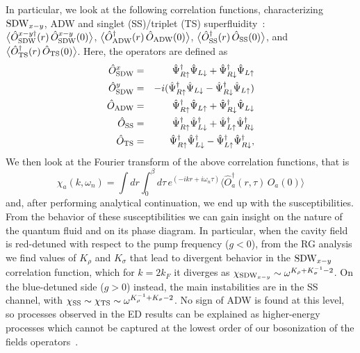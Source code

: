 \documentclass[pra,aps,superscriptaddress,twocolumn]{revtex4}
\begin{document}
In particular, we look at the following correlation functions, characterizing ${\rm SDW}_{x-y}$, ADW and singlet (SS)/triplet (TS) superfluidity~\cite{Giamarchi}:
$\big\langle \hat O_{\rm SDW}^{x-y \dagger}(r) \, \hat O_{\rm SDW}^{x-y}(0) \big\rangle$, 
$\big\langle \hat O_{\rm ADW}^\dagger(r) \, \hat O_{\rm ADW}(0) \big\rangle$,
$\big\langle\hat O_{\rm SS}^\dagger(r) \, \hat O_{\rm SS}(0) \big\rangle$, and
$\big\langle \hat O_{\rm TS}^\dagger(r) \, \hat O_{\rm TS}(0) \big\rangle$.
Here, the operators are defined as
\begin{eqnarray}
\hat O_{\rm SDW}^{x} & = & \hat \Psi_{R\uparrow}^\dagger \hat\Psi_{L\downarrow}+\hat \Psi_{R\downarrow}^\dagger \hat\Psi_{L\uparrow}\\
\hat O_{\rm SDW}^{y} & = & -i(\hat \Psi_{R\uparrow}^\dagger \hat\Psi_{L\downarrow}-\hat \Psi_{R\downarrow}^\dagger \hat\Psi_{L\uparrow})\\
\hat O_{\rm ADW} & = & \hat \Psi_{R\uparrow}^\dagger \hat\Psi_{L\uparrow}+\hat \Psi_{R\downarrow}^\dagger \hat\Psi_{L\downarrow}\\
\hat O_{\rm SS} & = & \hat \Psi_{R\uparrow}^\dagger \hat\Psi_{L\downarrow}^\dagger+\hat \Psi_{L\uparrow}^\dagger \hat\Psi_{R\downarrow}^\dagger\\
\hat O_{\rm TS}&=&\hat \Psi_{R\uparrow}^\dagger \hat\Psi_{L\downarrow}^\dagger-\hat \Psi_{L\uparrow}^\dagger \hat\Psi_{R\downarrow}^\dagger,
\end{eqnarray}
We then look at the Fourier transform of the above correlation functions, that is
\begin{equation}
\chi_a (k,\omega_n) =\! \int \! dr \int_0^\beta \! d\tau \,e^{(-ikr+i\omega_n \tau)} \big\langle \hat O_{a}^\dagger(r, \tau) \, \hat O_{a}(0) \big\rangle
\end{equation}
and, after performing analytical continuation, we end up with the susceptibilities.
From the behavior of these susceptibilities we  can gain insight on the nature of the quantum fluid and on its phase diagram. In particular, when the cavity field is
red-detuned with respect to the pump frequency ($g<0$), from the RG analysis we find values of $K_\rho$ and $K_\sigma$ that lead to divergent behavior
in the ${\rm SDW}_{x-y}$ correlation function, which for $k=2k_F$ it diverges as
$\chi_{{\rm SDW}_{x-y}}\sim \omega^{K_\rho+K_\sigma^{-1}-2}$. On the blue-detuned side ($g>0$) instead, the main instabilities are in the SS channel, with
$\chi_{\rm SS}\sim \chi_{{\rm TS}}\sim \omega^{K_\rho^{-1}+K_\sigma-2}$. No sign of ADW is found at this level,
so processes observed in the ED results can be explained as higher-energy processes which cannot be captured at the
lowest order of our bosonization of the fields operators~\cite{LongPaper}.
\end{document}
